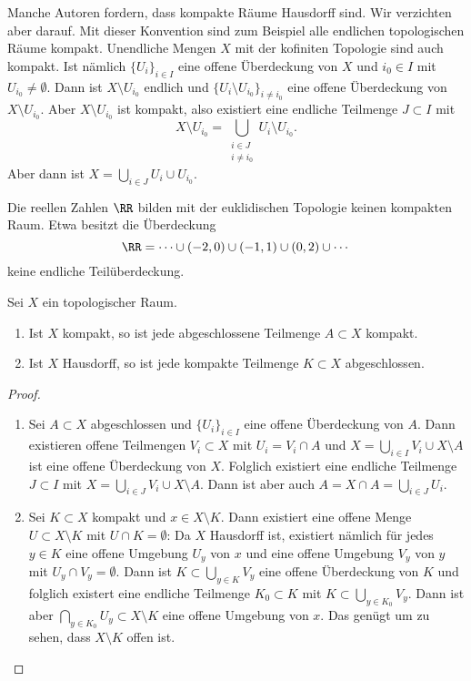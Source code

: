 Manche Autoren fordern, dass kompakte Räume Hausdorff sind. Wir verzichten aber darauf. Mit dieser Konvention sind zum Beispiel alle endlichen topologischen Räume kompakt. Unendliche Mengen $X$ mit der kofiniten Topologie sind auch kompakt. Ist nämlich $\{U_i\}_{i\in I}$ eine offene Überdeckung von $X$ und $i_0\in I$ mit $U_{i_0} \neq \emptyset$. Dann ist $X\setminus U_{i_0}$ endlich und $\{U_i\setminus U_{i_0}\}_{i\neq i_0}$ eine offene Überdeckung von $X\setminus U_{i_0}$. Aber $X \setminus U_{i_0}$ ist kompakt, also existiert eine endliche Teilmenge $J\subset I$ mit
\[
X\setminus U_{i_0} = \bigcup_{\substack{i\in J\\ i\neq i_0}} U_i\setminus U_{i_0}.
\]
Aber dann ist $X = \bigcup_{i\in J} U_i \cup U_{i_0}$.

Die reellen Zahlen $\RR$ bilden mit der euklidischen Topologie keinen kompakten Raum. Etwa besitzt die Überdeckung
\[
\RR = \cdots \cup (-2,0) \cup (-1,1) \cup (0,2) \cup \cdots
\]
keine endliche Teilüberdeckung.

\begin{lemma}\label{lem1}
Sei $X$ ein topologischer Raum.
\begin{enumerate}
\item Ist $X$ kompakt, so ist jede abgeschlossene Teilmenge $A\subset X$ kompakt.
\item Ist $X$ Hausdorff, so ist jede kompakte Teilmenge $K\subset X$ abgeschlossen.
\end{enumerate}
\end{lemma}
\begin{proof}\leavevmode
\begin{enumerate}
\item Sei $A\subset X$ abgeschlossen und $\{U_i\}_{i\in I}$ eine offene Überdeckung von $A$. Dann existieren offene Teilmengen $V_i\subset X$ mit $U_i = V_i\cap A$ und $X = \bigcup_{i\in I} V_i \cup X\setminus A$ ist eine offene Überdeckung von $X$. Folglich existiert eine endliche Teilmenge $J\subset I$ mit $X = \bigcup_{i\in J} V_i \cup X\setminus A$. Dann ist aber auch $A = X\cap A = \bigcup_{i\in J} U_i$.
\item Sei $K\subset X$ kompakt und $x\in X\setminus K$. Dann existiert eine offene Menge $U\subset X\setminus K$ mit $U\cap K = \emptyset$: Da $X$ Hausdorff ist, existiert nämlich für jedes $y\in K$ eine offene Umgebung $U_y$ von $x$ und eine offene Umgebung $V_y$ von $y$ mit $U_y\cap V_y=\emptyset$. Dann ist $K \subset \bigcup_{y\in K} V_y$ eine offene Überdeckung von $K$ und folglich existert eine endliche Teilmenge $K_0\subset K$ mit $K\subset \bigcup_{y\in K_0} V_y$. Dann ist aber $\bigcap_{y\in K_0} U_y \subset X\setminus K$ eine offene Umgebung von $x$. Das genügt um zu sehen, dass $X\setminus K$ offen ist. \qedhere
\end{enumerate}
\end{proof}

